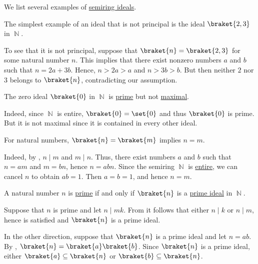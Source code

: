 \begin{example}\label{ex:def:semiring_ideal}
  We list several examples of \hyperref[def:semiring_ideal]{semiring ideals}.
  \begin{thmenum}
     The simplest example of an ideal that is not principal is the ideal \( \braket{ 2, 3 } \) in \( \BbbN \).

    To see that it is not principal, suppose that \( \braket{ n } = \braket{ 2, 3 } \) for some natural number \( n \). This implies that there exist nonzero numbers \( a \) and \( b \) such that \( n = 2a + 3b \). Hence, \( n > 2a > a \) and \( n > 3b > b \). But then neither \( 2 \) nor \( 3 \) belongs to \( \braket{ n } \), contradicting our assumption.

     The zero ideal \( \braket{ 0 } \) in \( \BbbN \) is \hyperref[def:semiring_ideal/prime]{prime} but not \hyperref[def:semiring_ideal/maximal]{maximal}.

    Indeed, since \( \BbbN \) is entire, \( \braket{ 0 } = \set{ 0 } \) and thus \( \braket{ 0 } \) is prime. But it is not maximal since it is contained in every other ideal.

     For natural numbers, \( \braket{ n } = \braket{ m } \) implies \( n = m \).

    Indeed, by , \( n \mid m \) and \( m \mid n \). Thus, there exist numbers \( a \) and \( b \) such that \( n = am \) and \( m = bn \), hence \( n = abn \). Since the semiring \( \BbbN \) is \hyperref[def:entire_semiring]{entire}, we can cancel \( n \) to obtain \( ab = 1 \). Then \( a = b = 1 \), and hence \( n = m \).

     A natural number \( n \) is \hyperref[def:prime_number]{prime} if and only if \( \braket{n} \) is a \hyperref[def:semiring_ideal/prime]{prime ideal} in \( \BbbN \).

    Suppose that \( n \) is prime and let \( n \mid mk \). From  it follows that either \( n \mid k \) or \( n \mid m \), hence  is satisfied and \( \braket{ n } \) is a prime ideal.

    In the other direction, suppose that \( \braket{ n } \) is a prime ideal and let \( n = ab \). By , \( \braket{ n } = \braket{ a } \braket{ b } \). Since \( \braket{ n } \) is a prime ideal, either \( \braket{ a } \subseteq \braket{ n } \) or \( \braket{ b } \subseteq \braket{ n } \).


\end{thmenum}
\end{example}
